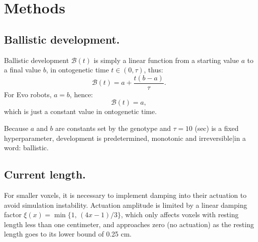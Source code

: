 
\section{Methods}
\label{sec:methods}


\subsection{Ballistic development.}

Ballistic development 
$\mathcal{B}(t)$
is simply a linear function from a starting value $a$ to a final value $b$, in ontogenetic time $t\in(0,\tau)$, thus: 
\begin{equation}
\label{eq:ballistic-devo}
\mathcal{B}(t) = a + \frac{t(b-a)}{\tau}.
\end{equation}
For Evo robots, $a=b$, hence:
\begin{equation}
\label{eq:no-devo}
\mathcal{B}(t) = a,
\end{equation}
which is just a constant value in ontogenetic time.

Because $a$ and $b$ are constants set by the genotype and $\tau=10$ (sec) is a fixed hyperparameter, development is predetermined, monotonic and irreversible|in a word: ballistic.



\subsection{Current length.} 

For smaller voxels, it is necessary to implement damping into their actuation to avoid simulation instability. 
Actuation amplitude is limited by a linear damping factor $\xi(x) = \min\{1,\, (4x-1)/3\}$, which only affects voxels with resting length less than one centimeter, and approaches zero (no actuation) as the resting length goes to its lower bound of 0.25 cm.

